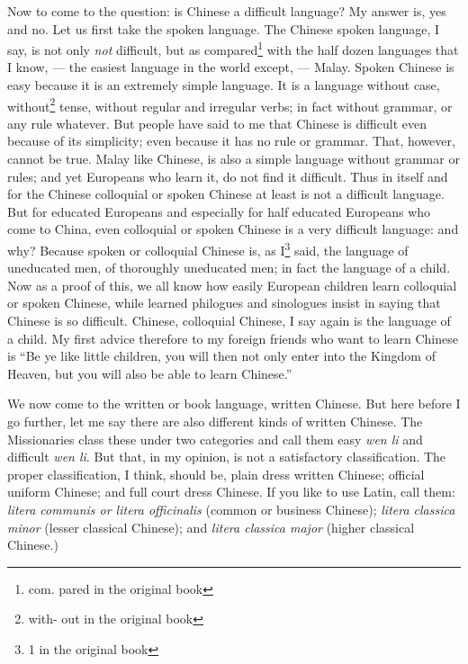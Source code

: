 Now to come to the question: is Chinese a difficult language?
My answer is, yes and no.
Let us first take the spoken language.
The Chinese spoken language, I say, is not only \emph{not} difficult, but as compared\footnote{com. pared in the original book} with the half dozen languages that I know, --- the easiest language in the world except, --- Malay.
Spoken Chinese is easy because it is an extremely simple language.
It is a language without case, without\footnote{with- out in the original book} tense, without regular and irregular verbs; in fact without grammar, or any rule whatever.
But people have said to me that Chinese is difficult even because of its simplicity; even because it has no rule or grammar.
That, however, cannot be true.
Malay like Chinese, is also a simple language without grammar or rules; and yet Europeans who learn it, do not find it difficult.
Thus in itself and for the Chinese colloquial or spoken Chinese at least is not a difficult language.
But for educated Europeans and especially for half educated Europeans who come to China, even colloquial or spoken Chinese is a very difficult language: and why?
Because spoken or colloquial Chinese is, as I\footnote{1 in the original book} said, the language of uneducated men, of thoroughly uneducated men; in fact the language of a child.
Now as a proof of this, we all know how easily European children learn colloquial or spoken Chinese, while learned philogues and sinologues insist in saying that Chinese is so difficult.
Chinese, colloquial Chinese, I say again is the language of a child.
My first advice therefore to my foreign friends who want to learn Chinese is ``Be ye like little children, you will then not only enter into the Kingdom of Heaven, but you will also be able to learn Chinese.''

We now come to the written or book language, written Chinese.
But here before I go further, let me say there are also different kinds of written Chinese.
The Missionaries class these under two categories and call them easy \emph{wen li} and difficult \emph{wen li}.
But that, in my opinion, is not a satisfactory classification.
The proper classification, I think, should be, plain dress written Chinese; official uniform Chinese;  and full court dress Chinese.
If you like to use Latin, call them: \emph{litera communis or litera officinalis} (common or business Chinese); \emph{litera classica minor} (lesser classical Chinese); and \emph{litera classica major} (higher classical Chinese.)

